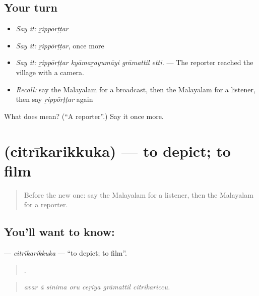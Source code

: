 \subsection*{Your turn}
\begin{itemize}
\raggedright
  \item \emph{Say it:} \emph{ṟippōrṭṭar}
  \item \emph{Say it:} \emph{ṟippōrṭṭar}, once more
  \item \emph{Say it:} \emph{ṟippōrṭṭar kyāmaṟayumāyi grāmattil etti.} — The reporter reached the village with a camera.
  \item \emph{Recall:} say the Malayalam for a broadcast, then the Malayalam for a listener, then say \emph{ṟippōrṭṭar} again
\end{itemize}

\begin{tcolorbox}[breakable,colback=teal!4,colframe=teal!35!black,title={Before you move on}]
What does  mean? (\textquotedblleft{}A reporter\textquotedblright{}.) Say it once more.
\end{tcolorbox}
\section[\texorpdfstring{\ml{ചിത്രീകരിക്കുക} (citrīkarikkuka)}{ചിത്രീകരിക്കുക (citrīkarikkuka)}]{ (citrīkarikkuka) — to depict; to film}

\label{lesson:ML-C351-citrikarikkuka}



\begin{quote}
Before the new one: say the Malayalam for a listener, then the Malayalam for a reporter.
\end{quote}

\subsection*{You'll want to know: }
\textbf{} — \emph{citrīkarikkuka} — \textquotedblleft{}to depict; to film\textquotedblright{}.

\begin{quote}
      .
\end{quote}

\begin{quote}
\emph{avar ā sinima oru ceṟiya grāmattil citrīkariccu.}
\end{quote}

